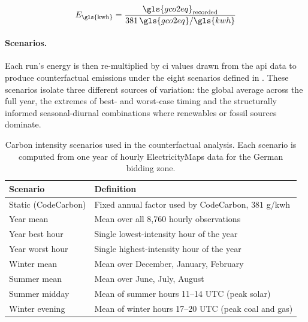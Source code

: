 \begin{equation}
E_{\text{\gls{kwh}}} = \frac{{\gls{gco2eq}}_{\text{recorded}}}{381 \, \gls{gco2eq}/\gls{kwh}}
\label{eq:energy_derivation}
\end{equation}

\paragraph{Scenarios.}
Each run's energy is then re-multiplied by \gls{ci} values drawn from the \gls{api} data to produce counterfactual emissions under the eight scenarios defined in . These scenarios isolate three different sources of variation: the global average across the full year, the extremes of best- and worst-case timing and the structurally informed seasonal-diurnal combinations where renewables or fossil sources dominate.

\begin{table}[htbp]
\centering
\caption[Carbon intensity scenarios for counterfactual analysis.]{Carbon intensity scenarios used in the counterfactual analysis. Each scenario is computed from one year of hourly ElectricityMaps data for the German bidding zone.}
\label{tab:carbon_scenarios}
\begin{tabular}{ll}
\toprule
\textbf{Scenario} & \textbf{Definition} \\
\midrule
Static (CodeCarbon) & Fixed annual factor used by CodeCarbon, $381$ g/\gls{kwh} \\
Year mean           & Mean over all 8{,}760 hourly observations \\
Year best hour      & Single lowest-intensity hour of the year \\
Year worst hour     & Single highest-intensity hour of the year \\
Winter mean         & Mean over December, January, February \\
Summer mean         & Mean over June, July, August \\
Summer midday       & Mean of summer hours 11--14 UTC (peak solar) \\
Winter evening      & Mean of winter hours 17--20 UTC (peak coal and gas) \\
\bottomrule
\end{tabular}
\end{table}

